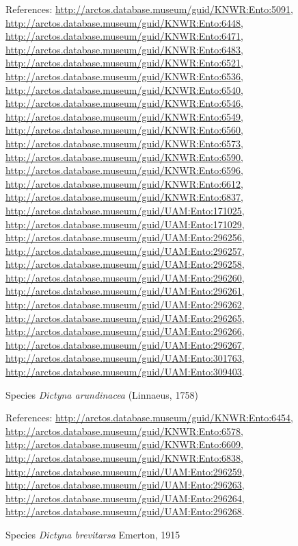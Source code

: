 \documentclass[9pt, article]{memoir}
\begin{document}
\begin{multicols}{2}
\vspace{6pt}References: 
\url{http://arctos.database.museum/guid/KNWR:Ento:5091}, 
\url{http://arctos.database.museum/guid/KNWR:Ento:6448}, 
\url{http://arctos.database.museum/guid/KNWR:Ento:6471}, 
\url{http://arctos.database.museum/guid/KNWR:Ento:6483}, 
\url{http://arctos.database.museum/guid/KNWR:Ento:6521}, 
\url{http://arctos.database.museum/guid/KNWR:Ento:6536}, 
\url{http://arctos.database.museum/guid/KNWR:Ento:6540}, 
\url{http://arctos.database.museum/guid/KNWR:Ento:6546}, 
\url{http://arctos.database.museum/guid/KNWR:Ento:6549}, 
\url{http://arctos.database.museum/guid/KNWR:Ento:6560}, 
\url{http://arctos.database.museum/guid/KNWR:Ento:6573}, 
\url{http://arctos.database.museum/guid/KNWR:Ento:6590}, 
\url{http://arctos.database.museum/guid/KNWR:Ento:6596}, 
\url{http://arctos.database.museum/guid/KNWR:Ento:6612}, 
\url{http://arctos.database.museum/guid/KNWR:Ento:6837}, 
\url{http://arctos.database.museum/guid/UAM:Ento:171025}, 
\url{http://arctos.database.museum/guid/UAM:Ento:171029}, 
\url{http://arctos.database.museum/guid/UAM:Ento:296256}, 
\url{http://arctos.database.museum/guid/UAM:Ento:296257}, 
\url{http://arctos.database.museum/guid/UAM:Ento:296258}, 
\url{http://arctos.database.museum/guid/UAM:Ento:296260}, 
\url{http://arctos.database.museum/guid/UAM:Ento:296261}, 
\url{http://arctos.database.museum/guid/UAM:Ento:296262}, 
\url{http://arctos.database.museum/guid/UAM:Ento:296265}, 
\url{http://arctos.database.museum/guid/UAM:Ento:296266}, 
\url{http://arctos.database.museum/guid/UAM:Ento:296267}, 
\url{http://arctos.database.museum/guid/UAM:Ento:301763}, 
\url{http://arctos.database.museum/guid/UAM:Ento:309403}.

\vspace{6pt}\noindent\hspace{36pt}Species \textit{Dictyna arundinacea} (Linnaeus, 1758)


\vspace{6pt}References: 
\url{http://arctos.database.museum/guid/KNWR:Ento:6454}, 
\url{http://arctos.database.museum/guid/KNWR:Ento:6578}, 
\url{http://arctos.database.museum/guid/KNWR:Ento:6609}, 
\url{http://arctos.database.museum/guid/KNWR:Ento:6838}, 
\url{http://arctos.database.museum/guid/UAM:Ento:296259}, 
\url{http://arctos.database.museum/guid/UAM:Ento:296263}, 
\url{http://arctos.database.museum/guid/UAM:Ento:296264}, 
\url{http://arctos.database.museum/guid/UAM:Ento:296268}.

\vspace{6pt}\noindent\hspace{36pt}Species \textit{Dictyna brevitarsa} Emerton, 1915



\end{multicols}
\end{document}
